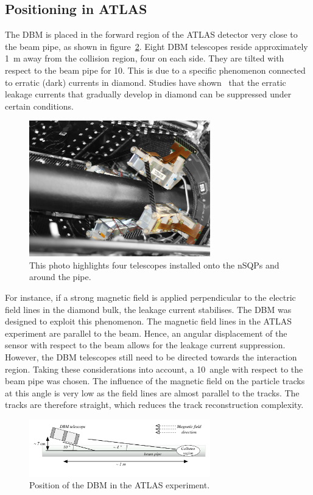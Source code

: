 \subsection{Positioning in ATLAS}
The DBM is placed in the forward region of the ATLAS detector very close to the beam pipe, as shown in figure~\ref{fig:dbminatlas}. Eight DBM telescopes reside approximately 1~m away from the collision region, four on each side. They are tilted with respect to the beam pipe for 10\textdegree. This is due to a specific phenomenon connected to erratic (dark) currents in diamond. Studies have shown~\cite{Mueller:1175553} that the erratic leakage currents that gradually develop in diamond can be suppressed under certain conditions. 
\begin{figure}[!t]
\centering
\includegraphics[width=0.7\textwidth]{04_charge_monitoring/pics/DBM-installed-colour1}
\caption{This photo highlights four telescopes installed onto the nSQPs and around the pipe.}
\label{fig:dbminatlas}
\end{figure}
For instance, if a strong magnetic field is applied perpendicular to the electric field lines in the diamond bulk, the leakage current stabilises. The DBM was designed to exploit this phenomenon. The magnetic field lines in the ATLAS experiment are parallel to the beam. Hence, an angular displacement of the sensor with respect to the beam allows for the leakage current suppression. However, the DBM telescopes still need to be directed towards the interaction region. Taking these considerations into account, a 10\textdegree~angle with respect to the beam pipe was chosen. The influence of the magnetic field on the particle tracks at this angle is very low as the field lines are almost parallel to the tracks. The tracks are therefore straight, which reduces the track reconstruction complexity.

\begin{figure}[!t]
\centering
\includegraphics[width=0.7\textwidth]{../scripts/04_charge_monitoring/plots/DBM-positioning}
\caption{Position of the DBM in the ATLAS experiment.}
\label{fig:dbminatlas}
\end{figure}





